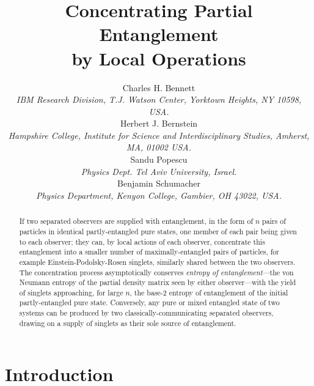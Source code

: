 \title{Concentrating Partial Entanglement \\ by Local Operations}
\author{Charles H. Bennett \\
{\protect\small\sl IBM Research Division, T.J. Watson Center,
Yorktown Heights, NY 10598, USA.} \\
Herbert J. Bernstein \\
{\protect\small\sl Hampshire College, Institute for Science and
Interdisciplinary Studies,
Amherst, MA, 01002 USA.} \\
Sandu Popescu \\
{\protect\small\sl
Physics Dept. Tel Aviv University, Israel.} \\
Benjamin Schumacher \\
{\protect\small\sl Physics Department, Kenyon College, Gambier,
OH 43022, USA.}}
 
\begin{abstract}
If two separated observers are supplied with entanglement, in the form
of $n$ pairs of particles in identical partly-entangled pure states,
one member of each pair being given to each observer; they can, by
local actions of each observer, concentrate this entanglement into
a smaller number of maximally-entangled pairs of particles,
for example Einstein-Podolsky-Rosen singlets, similarly shared between
the two observers.  The concentration process asymptotically
conserves {\em entropy of entanglement}---the von Neumann entropy of
the partial density matrix seen by either observer---with the yield of
singlets approaching, for large $n$, the base-2 entropy of
entanglement of the initial partly-entangled pure state.  Conversely,
any pure or mixed entangled state of two systems can be produced by
two classically-communicating separated observers, drawing on a
supply of singlets as their sole source of entanglement.
\end{abstract}

\maketitle

\newpage
\section{Introduction}
 
